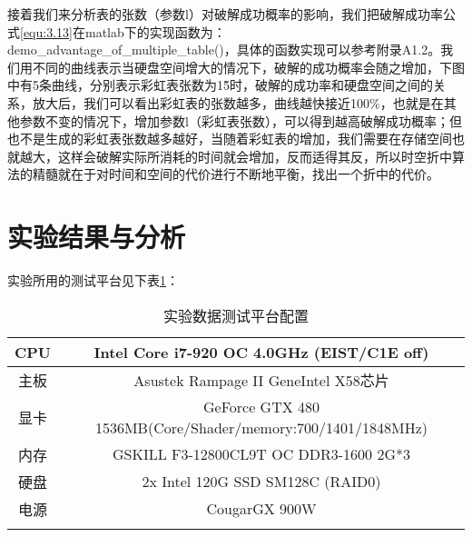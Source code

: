 接着我们来分析表的张数（参数l）对破解成功概率的影响，我们把破解成功率公式\eqref{equ:3.13}在matlab下的实现函数为：\\
demo\_advantage\_of\_multiple\_table()，具体的函数实现可以参考附录A1.2。我们用不同的曲线表示当硬盘空间增大的情况下，破解的成功概率会随之增加，下图中有5条曲线，分别表示彩虹表张数为1\~5时，破解的成功率和硬盘空间之间的关系，放大后，我们可以看出彩虹表的张数越多，曲线越快接近100\%，也就是在其他参数不变的情况下，增加参数l（彩虹表张数），可以得到越高破解成功概率；但也不是生成的彩虹表张数越多越好，当随着彩虹表的增加，我们需要在存储空间也就越大，这样会破解实际所消耗的时间就会增加，反而适得其反，所以时空折中算法的精髓就在于对时间和空间的代价进行不断地平衡，找出一个折中的代价。
\begin{figure}[!h]
\begin{floatrow}
\end{floatrow}
\end{figure}
\begin{figure}[!h]
\begin{floatrow}
\end{floatrow}
\end{figure}
\clearpage
\section{实验结果与分析}
实验所用的测试平台见下表\ref{tab:5.3}：
\begin{longtable}{@{\extracolsep{\fill}}cc}
\caption{实验数据测试平台配置}\\\toprule[1pt]
\multicolumn{1}{c}{CPU} & \multicolumn{1}{c}{Intel Core i7-920 OC 4.0GHz (EIST/C1E off)} \\\hline
主板 & Asustek Rampage II GeneIntel X58芯片 \\\hline
显卡 & GeForce GTX 480 1536MB(Core/Shader/memory:700/1401/1848MHz) \\\hline
内存 & GSKILL F3-12800CL9T OC DDR3-1600 2G*3 \\\hline
硬盘 & 2x Intel 120G SSD SM128C (RAID0) \\\hline
电源 &  CougarGX 900W  \\
\bottomrule[1pt]
\label{tab:5.3}
\end{longtable}
